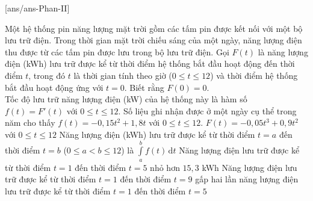 \cauds
{}[ans/ans\currfilebase-Phan-II]
\begin{ex}%
	Một hệ thống pin năng lượng mặt trời gồm các tấm pin được kết nối với một bộ lưu trữ điện. Trong thời gian mặt trời chiếu sáng của một ngày, năng lượng điện thu được từ các tấm pin được lưu trong bộ lưu trữ điện. Gọi $F(t)$ là năng lượng điện (kWh) lưu trữ được kể từ thời điểm hệ thống bắt đầu hoạt động đến thời điểm $t$, trong đó $t$ là thời gian tính theo giờ ($0 \le t \le 12$) và thời điểm hệ thống bắt đầu hoạt động ứng với $t=0$. Biết rằng $F(0)=0$.\\
	\noindent Tốc độ lưu trữ năng lượng điện (kW) của hệ thống này là hàm số $f(t)=F'(t)$ với $0 \le t \le 12$. Số liệu ghi nhận được ở một ngày cụ thể trong năm cho thấy $f(t)=-0{,}15t^2+1{,}8t$ với $0 \le t \le 12$.
	\choiceTF
		{\True $F(t)=-0{,}05t^3+0{,}9t^2$ với $0 \le t \le 12$}
		{\True Năng lượng điện (kWh) lưu trữ được kể từ thời điểm $t=a$ đến thời điểm $t=b$ ($0 \le a < b \le 12$) là $\displaystyle\int\limits_a^b f(t)\mathrm{\,d}t$}
		{Năng lượng điện lưu trữ được kể từ thời điểm $t=1$ đến thời điểm $t=5$ nhỏ hơn $15{,}3$ kWh}
		{Năng lượng điện lưu trữ được kể từ thời điểm $t=1$ đến thời điểm $t=9$ gấp hai lần năng lượng điện lưu trữ được kể từ thời điểm $t=1$ đến thời điểm $t=5$}
\end{ex}

